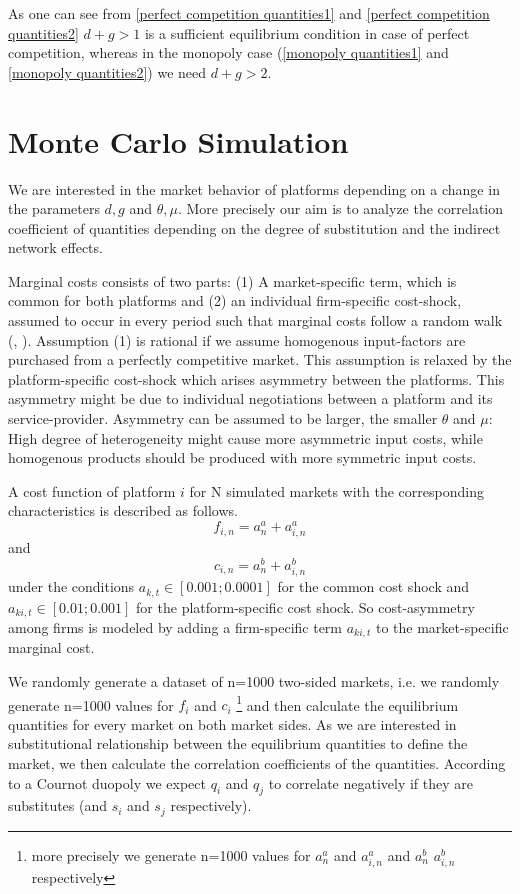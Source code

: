 \documentclass[10pt,a4paper]{scrreprt}
\begin{document}
As one can see from \ref{perfect competition quantities1} and \ref{perfect competition quantities2} $d+g > 1$ is a sufficient equilibrium condition in case of perfect competition, whereas in the monopoly case (\ref{monopoly quantities1} and \ref{monopoly quantities2}) we need $d+g>2$. 

\section{Monte Carlo Simulation}
We are interested in the market behavior of platforms depending on a change in the parameters $d, g$ and $\theta, \mu$. More precisely our aim is to analyze the correlation coefficient of quantities depending on the degree of substitution and the indirect network effects.

Marginal costs consists of two parts: (1) A market-specific term, which is common for both platforms and (2) an individual firm-specific cost-shock, assumed to occur in every period such that marginal costs follow a random walk (\cite[241]{harrington_detecting_2008}, \cite{paha_empirical_2011}). Assumption (1) is rational if we assume homogenous input-factors are purchased from a perfectly competitive market. This assumption is relaxed by the platform-specific cost-shock which arises asymmetry between the platforms. This asymmetry might be due to individual negotiations between a platform and its service-provider. Asymmetry can be assumed to be larger, the smaller $\theta$ and $\mu$: High degree of heterogeneity might cause more asymmetric input costs, while homogenous products should be produced with more symmetric input costs. 

A cost function of platform $i$ for N simulated markets with the corresponding characteristics is described as follows.
\begin{equation}
f_{i,n} = a^a_n+a^a_{i,n}
\end{equation} and 
\begin{equation}
c_{i,n} = a^b_n+a^b_{i,n}
\end{equation}
under the conditions $a_{k,t} \in [0.001;0.0001] $ for the common cost shock and $a_{ki,t} \in [0.01;0.001] $ for the platform-specific cost shock. So cost-asymmetry among firms is modeled by adding a firm-specific term $a_{ki,t}$ to the market-specific marginal cost. 

We randomly generate a dataset of n=1000 two-sided markets, i.e. we randomly generate n=1000 values for $f_i$ and $c_i$ \footnote{more precisely we generate n=1000 values for $a^a_n$ and $a^a_{i,n}$ and $a^b_n$ $a^b_{i,n}$ respectively} and then calculate the equilibrium quantities for every market on both market sides. As we are interested in substitutional relationship between the equilibrium quantities to define the market, we then calculate the correlation coefficients of the quantities. According to a Cournot duopoly we expect $q_i$ and $q_j$ to correlate negatively if they are substitutes (and $s_i$ and $s_j$ respectively). 
\end{document}
